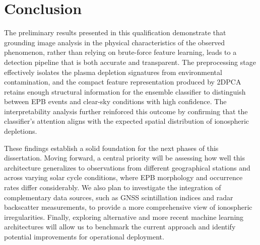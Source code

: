 \chapter{Conclusion}\label{chap:conclusion}

The preliminary results presented in this qualification demonstrate that grounding image analysis in the physical characteristics of the observed phenomenon, rather than relying on brute-force feature learning, leads to a detection pipeline that is both accurate and transparent. The preprocessing stage effectively isolates the plasma depletion signatures from environmental contamination, and the compact feature representation produced by 2DPCA retains enough structural information for the ensemble classifier to distinguish between EPB events and clear-sky conditions with high confidence. The interpretability analysis further reinforced this outcome by confirming that the classifier's attention aligns with the expected spatial distribution of ionospheric depletions.

These findings establish a solid foundation for the next phases of this dissertation. Moving forward, a central priority will be assessing how well this architecture generalizes to observations from different geographical stations and across varying solar cycle conditions, where EPB morphology and occurrence rates differ considerably. We also plan to investigate the integration of complementary data sources, such as GNSS scintillation indices and radar backscatter measurements, to provide a more comprehensive view of ionospheric irregularities. Finally, exploring alternative and more recent machine learning architectures will allow us to benchmark the current approach and identify potential improvements for operational deployment.
